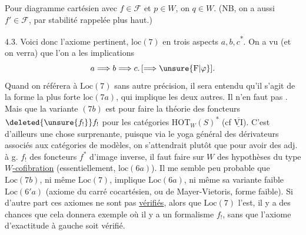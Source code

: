 Pour  diagramme cartésien
avec $f\in\mathcal F$ et $p\in W$, on  $q\in W$. (NB, on
a aussi $f'\in\mathcal F$, par  stabilité rappelée plus haut.)

4.3. Voici donc  l'axiome pertinent, $\mathrm{loc}(7)$
 en trois aspects $a,b,c$\textsuperscript{*}. On
a vu (et on verra) que l'on a les
implications
\[
a\Longrightarrow b\Longrightarrow c.\,[\Longrightarrow\unsure{\mathrm F|\varphi}].
\]
Quand on référera à $\mathrm{Loc}(7)$ sans autre précision,
il sera entendu qu'il s'agit de la
forme la plus forte $\mathrm{loc}(7a)$, qui implique
les deux autres. Il n'en faut pas
 . Mais
 que la variante   $(7b)$ est
 pour faire la théorie des foncteurs
$\deleted{\unsure{f_!}} f_!$ pour les catégories $\mathrm{HOT}_W(S)$\textsuperscript{*} (cf $\overline{\underline{\mathrm{VI}}}$).
C'est d'ailleurs une chose surprenante,
puisque via le yoga général des dérivateurs
associés aux catégories de modèles, on s'attendrait plutôt que pour avoir des adj. à g.
$f_!$ des foncteurs $f^*$ d'image inverse, il faut
faire sur $W$ des hypothèses du type
\uline{$W$-cofibration}  (essentiellement, $\mathrm{loc}(6a)$).
Il me semble peu probable que  $\mathrm{Loc}(7b)$,
ni même $\mathrm{Loc}(7)$, implique $\mathrm{Loc}(6a)$, ni
même sa variante  faible $\mathrm{Loc}(6'a)$ (axiome
du carré cocartésien, ou de Mayer-Vietoris,
forme faible).  Si d'autre
part ces axiomes ne sont pas \uline{vérifiés}, alors
que $\mathrm{Loc}(7)$ l'est, il y a des chances que
cela donnera  exemple  où il
y a un formalisme  $f_!$, sans que
l'axiome d'exactitude à gauche soit
vérifié.

